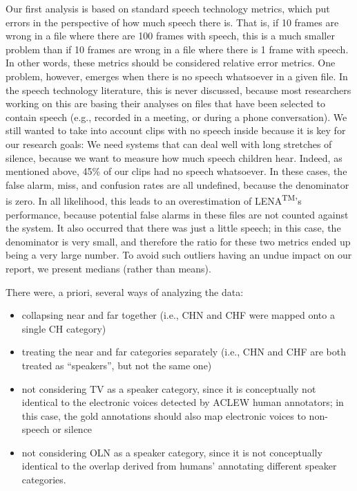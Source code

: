 \documentclass[english,floatsintext,man]{apa6}
\providecommand{\tightlist}{%
  \setlength{\itemsep}{0pt}\setlength{\parskip}{0pt}}
\begin{document}
Our first analysis is based on standard speech technology metrics, which
put errors in the perspective of how much speech there is. That is, if
10 frames are wrong in a file where there are 100 frames with speech,
this is a much smaller problem than if 10 frames are wrong in a file
where there is 1 frame with speech. In other words, these metrics should
be considered relative error metrics. One problem, however, emerges when
there is no speech whatsoever in a given file. In the speech technology
literature, this is never discussed, because most researchers working on
this are basing their analyses on files that have been selected to
contain speech (e.g., recorded in a meeting, or during a phone
conversation). We still wanted to take into account clips with no speech
inside because it is key for our research goals: We need systems that
can deal well with long stretches of silence, because we want to measure
how much speech children hear. Indeed, as mentioned above, 45\% of our
clips had no speech whatsoever. In these cases, the false alarm, miss,
and confusion rates are all undefined, because the denominator is zero.
In all likelihood, this leads to an overestimation of
LENA\textsuperscript{TM}'s performance, because potential false alarms
in these files are not counted against the system. It also occurred that
there was just a little speech; in this case, the denominator is very
small, and therefore the ratio for these two metrics ended up being a
very large number. To avoid such outliers having an undue impact on our
report, we present medians (rather than means).

There were, a priori, several ways of analyzing the data:

\begin{itemize}
\tightlist
\item
  collapsing near and far together (i.e., CHN and CHF were mapped onto a
  single CH category)
\item
  treating the near and far categories separately (i.e., CHN and CHF are
  both treated as \enquote{speakers}, but not the same one)
\item
  not considering TV as a speaker category, since it is conceptually not
  identical to the electronic voices detected by ACLEW human annotators;
  in this case, the gold annotations should also map electronic voices
  to non-speech or silence
\item
  not considering OLN as a speaker category, since it is not
  conceptually identical to the overlap derived from humans' annotating
  different speaker categories.
\end{itemize}
\end{document}

